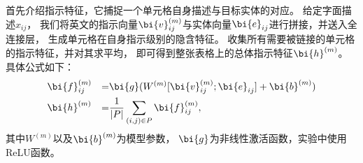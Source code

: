 首先介绍指示特征，它捕捉一个单元格自身描述与目标实体的对应。
给定字面描述$x_{ij}$，
我们将英文的指示向量$\bi{v}_{ij}^{(m)}$与实体向量$\bi{e}_{ij}$进行拼接，并送入全连接层，
生成单元格在自身指示级别的隐含特征。%
收集所有需要被链接的单元格的指示特征，并对其求平均，
即可得到整张表格上的总体指示特征$\bi{h}^{(m)}$。
具体公式如下：
\begin{equation}
  \label{eqn:tabel-mention}
  \begin{aligned}
    & \bi{f}_{ij}^{(m)} & = & \bi{g}(W^{(m)} [\bi{v}_{ij}^{(m)}; \bi{e}_{ij}] + \bi{b}^{(m)}) \\
    & \bi{h}^{(m)}      & = & \frac{1}{|P|} \sum_{(i,j) \in P} \bi{f}_{ij}^{(m)},
  \end{aligned}
\end{equation}
\noindent
其中$W^{(m)}$以及$\bi{b}^{(m)}$为模型参数，
$\bi{g}$为非线性激活函数，实验中使用ReLU函数。

%
%
%

